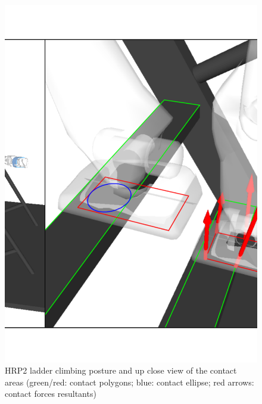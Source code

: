 
\begin{figure}[htpb]
  \centering
  \includegraphics[width=0.8\linewidth]{hrp2_inclined_ladder.pdf}
  \caption{HRP2 ladder climbing posture and up close view of the contact areas (green/red: contact polygons; blue: contact ellipse; red arrows: contact forces resultants)}
\label{fig:hrp2_darpa_complete}
\end{figure}

